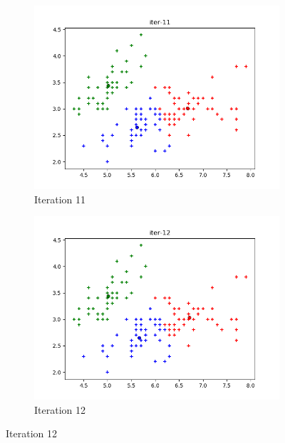 \documentclass[french]{article}
\begin{document}
\begin{figure}[h!]
\centering
\begin{subfigure}{.5\textwidth}
  \centering
  \includegraphics[width=\linewidth]{img/iter-11.png}
  \caption{Iteration 11}
\end{subfigure}%
\begin{subfigure}{.5\textwidth}
  \centering
  \includegraphics[width=\linewidth]{img/iter-12.png}
  \caption{Iteration 12}
\end{subfigure}%
\end{figure}


\newpage
\end{document}
